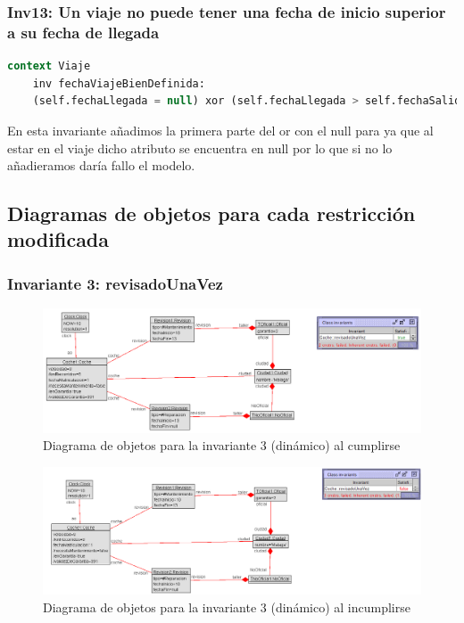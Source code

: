 \documentclass[12pt.a4paper]{article}
\begin{document}
\subsubsection{Inv13: Un viaje no puede tener una fecha de inicio superior a su fecha de llegada}
    \begin{lstlisting}[style = useEspecifico,language=SQL]
context Viaje
    inv fechaViajeBienDefinida:
    (self.fechaLlegada = null) xor (self.fechaLlegada > self.fechaSalida)
    \end{lstlisting}
    En esta invariante añadimos la primera parte del or con el null para ya que al estar en el viaje dicho atributo se encuentra en null por lo que si no lo añadieramos daría fallo el modelo.

\subsection{Diagramas de objetos para cada restricción modificada}
\subsubsection{Invariante 3: revisadoUnaVez}
\vspace{1.0 cm}
\begin{figure}[H]
     \includegraphics[width=1\linewidth]{Soils/dinamicoInv3_true.png}
     \caption{Diagrama de objetos para la invariante 3 (dinámico) al cumplirse}
\end{figure}

\begin{figure}[H]
     \includegraphics[width=1\linewidth]{Soils/dinamicoInv3_false.png}
     \caption{Diagrama de objetos para la invariante 3 (dinámico) al incumplirse}
\end{figure}
\end{document}
